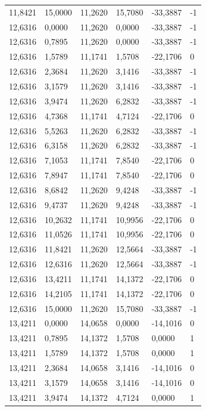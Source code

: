 \documentclass[12pt]{article}
\begin{document}
\begin{longtable}{@{}llllll@{}}
		11,8421 & 15,0000 & 11,2620 & 15,7080 & -33,3887 & -1 \\
		12,6316 & 0,0000  & 11,2620 & 0,0000  & -33,3887 & -1 \\
		12,6316 & 0,7895  & 11,2620 & 0,0000  & -33,3887 & -1 \\
		12,6316 & 1,5789  & 11,1741 & 1,5708  & -22,1706 & 0  \\
		12,6316 & 2,3684  & 11,2620 & 3,1416  & -33,3887 & -1 \\
		12,6316 & 3,1579  & 11,2620 & 3,1416  & -33,3887 & -1 \\
		12,6316 & 3,9474  & 11,2620 & 6,2832  & -33,3887 & -1 \\
		12,6316 & 4,7368  & 11,1741 & 4,7124  & -22,1706 & 0  \\
		12,6316 & 5,5263  & 11,2620 & 6,2832  & -33,3887 & -1 \\
		12,6316 & 6,3158  & 11,2620 & 6,2832  & -33,3887 & -1 \\
		12,6316 & 7,1053  & 11,1741 & 7,8540  & -22,1706 & 0  \\
		12,6316 & 7,8947  & 11,1741 & 7,8540  & -22,1706 & 0  \\
		12,6316 & 8,6842  & 11,2620 & 9,4248  & -33,3887 & -1 \\
		12,6316 & 9,4737  & 11,2620 & 9,4248  & -33,3887 & -1 \\
		12,6316 & 10,2632 & 11,1741 & 10,9956 & -22,1706 & 0  \\
		12,6316 & 11,0526 & 11,1741 & 10,9956 & -22,1706 & 0  \\
		12,6316 & 11,8421 & 11,2620 & 12,5664 & -33,3887 & -1 \\
		12,6316 & 12,6316 & 11,2620 & 12,5664 & -33,3887 & -1 \\
		12,6316 & 13,4211 & 11,1741 & 14,1372 & -22,1706 & 0  \\
		12,6316 & 14,2105 & 11,1741 & 14,1372 & -22,1706 & 0  \\
		12,6316 & 15,0000 & 11,2620 & 15,7080 & -33,3887 & -1 \\
		13,4211 & 0,0000  & 14,0658 & 0,0000  & -14,1016 & 0  \\
		13,4211 & 0,7895  & 14,1372 & 1,5708  & 0,0000   & 1  \\
		13,4211 & 1,5789  & 14,1372 & 1,5708  & 0,0000   & 1  \\
		13,4211 & 2,3684  & 14,0658 & 3,1416  & -14,1016 & 0  \\
		13,4211 & 3,1579  & 14,0658 & 3,1416  & -14,1016 & 0  \\
		13,4211 & 3,9474  & 14,1372 & 4,7124  & 0,0000   & 1  \\

\end{longtable}
\end{document}
